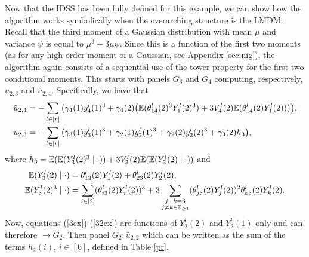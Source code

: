 Now that the IDSS has been fully defined for this example, we can show how the algorithm works symbolically when the overarching structure is the LMDM. Recall that the third  moment of a Gaussian distribution with mean $\mu$ and variance $\psi$ is equal to $\mu^3+3\mu\psi$. Since this is a function of the first two moments (as for any high-order moment of a Gaussian, see Appendix \ref{sec:nig}), the algorithm again consists of a sequential use of the tower property for the first two conditional moments. This starts with panels $G_3$ and $G_4$ computing, respectively, $\bar{u}_{2,3}$ and $\bar{u}_{2,4}$. Specifically, we have that   
\begin{align}
\label{4ex}\bar{u}_{2,4}&=-\sum_{l\in[r]}\big(\gamma_4(1)
y_4^l(1)^3+\gamma_4(2)\big(\E(\theta_{14}^l(2)^3Y_1^l(2)^3)+3V_4^l(2)\E(\theta_{14}^l(2)Y_1^l(2))\big)\big),\\
\label{3ex}\bar{u}_{2,3}&=-\sum_{l\in[r]}\big(\gamma_3(1)
y_3^l(1)^3+\gamma_2(1)
y_2^l(1)^3+\gamma_2(2)
y_2^l(2)^3+\gamma_3(2)h_3\big),
\end{align}
where $h_3=\mathbb{E}(\mathbb{E}(Y_3^l(2)^3\;|\;\cdot))+3V_3^l(2)\mathbb{E}(\mathbb{E}(Y_3^l(2)\;|\;\cdot))$ and 
\begin{align}
\label{31ex}\E(Y_3^l(2)\;|\;\cdot)&=\theta_{13}^l(2)Y_1^l(2)+\theta_{23}^l(2)Y_2^l(2),
\\
\label{32ex}\E(Y_3^l(2)^3\;|\;\cdot)&=\sum_{i\in[2]}(\theta_{i3}^l(2)Y_i^l(2))^3+3\sum_{\substack{j+k=3\\j\neq k\in\mathbb{Z}_{\geq 1}}}(\theta_{j3}^l(2)Y_j^l(2))^2\theta_{k3}^l(2)Y_k^l(2).
\end{align}
Now, equations (\ref{3ex})-(\ref{32ex}) are functions of $Y_2^l(2)$ and $Y_2^l(1)$ only and can therefore $\longrightarrow G_2$. Then panel $G_2:\bar{u}_{2,2}$ which can be written as the sum of the terms $h_{2}(i)$, $i\in[6]$, defined in Table \ref{pr}.
